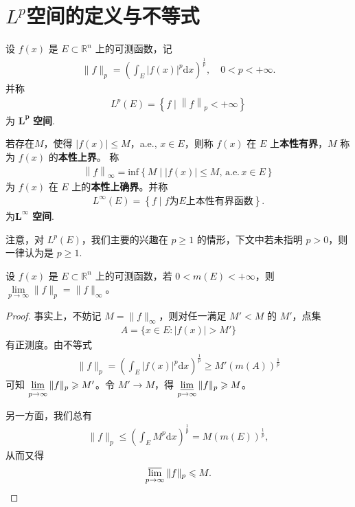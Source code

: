 \documentclass[../../main.tex]{subfiles}%
\begin{document}
\section{$L^p$空间的定义与不等式}

\begin{definition}[$L^p$空间]
设 $f(x)$ 是 $E\subset\mathbb{R}^n$ 上的可测函数，记
\begin{align*}
\|f\|_p = \left(\int_E |f(x)|^p \mathrm{d}x\right)^{\frac{1}{p}},\quad 0 < p < +\infty.
\end{align*}
并称
\begin{align*}
L^p\left( E \right) =\left\{ f\mid \left\| f \right\| _p<+\infty \right\} 
\end{align*}
为 $\boldsymbol{L}^{\boldsymbol{p}}$ \textbf{空间}.

若存在$M$，使得 $|f(x)| \leqslant M$，a.e., $x\in E$，则称 $f(x)$ 在 $E$ 上\textbf{本性有界}，$M$ 称为 $f(x)$ 的\textbf{本性上界}。
称
\begin{align*}
\left\| f \right\| _{\infty}=\mathrm{inf}\left\{ M\mid \left| f\left( x \right) \right|\leqslant M,\,\mathrm{a}.\mathrm{e}.\,x\in E \right\} 
\end{align*}
为 $f(x)$ 在 $E$ 上的\textbf{本性上确界}。并称
\begin{align*}
L^{\infty}\left( E \right) =\left\{ f\mid f\text{为}E\text{上本性有界函数} \right\} .
\end{align*}
为$\boldsymbol{L}^{\boldsymbol{\infty}}$ \textbf{空间}.
\end{definition}
\begin{remark}
注意，对 $L^p(E)$，我们主要的兴趣在 $p\geqslant 1$ 的情形，下文中若未指明 $p>0$，则一律认为是 $p\geqslant 1$.
\end{remark}

\begin{proposition}\label{proposition:fp极限就是f无穷}
设 $f(x)$ 是 $E\subset\mathbb{R}^n$ 上的可测函数，若 $0 < m(E) < +\infty$，则 $\lim\limits_{p\to\infty} \|f\|_p = \|f\|_\infty$。
\end{proposition}
\begin{proof}
事实上，不妨记 $M = \|f\|_\infty$，则对任一满足 $M' < M$ 的 $M'$，点集
\begin{align*}
A = \{x\in E: |f(x)| > M'\}
\end{align*}
有正测度。由不等式
\begin{align*}
\|f\|_p = \left(\int_E |f(x)|^p \mathrm{d}x\right)^{\frac{1}{p}} \geqslant M'(m(A))^{\frac{1}{p}}
\end{align*}
可知 $\varliminf\limits_{p\to\infty} \|f\|_p \geqslant M'$。令 $M'\to M$，得 $\varliminf\limits_{p\to\infty} \|f\|_p \geqslant M$。

另一方面，我们总有
\begin{align*}
\|f\|_p \leqslant \left(\int_E M^p \mathrm{d}x\right)^{\frac{1}{p}} = M(m(E))^{\frac{1}{p}},
\end{align*}
从而又得
\begin{align*}
\varlimsup\limits_{p\to\infty} \|f\|_p \leqslant M.
\end{align*}
\end{proof}
\end{document}
